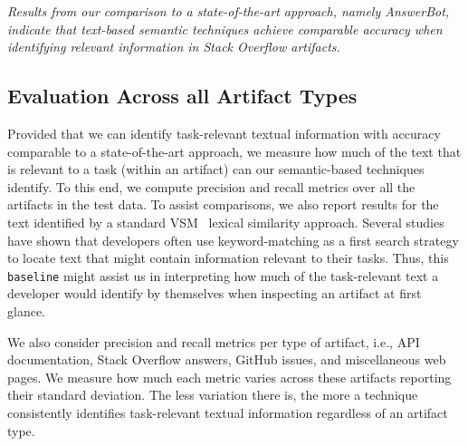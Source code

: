 





\medskip
\begin{bluequote}
    \textit{Results from our comparison to a state-of-the-art approach, namely AnswerBot, 
    indicate that text-based semantic techniques achieve comparable accuracy  
    when identifying relevant information in Stack Overflow artifacts.}
\end{bluequote}






\subsection{Evaluation Across all Artifact Types}
\label{cp5:results-all}





Provided that we can identify task-relevant textual information with accuracy comparable to a state-of-the-art approach, 
we measure how much of the text that is relevant to a task (within an artifact)
can our semantic-based techniques identify.
To this end, we compute precision and recall metrics over all the artifacts in the test data. 
To assist comparisons, we also report results for the text identified by a
standard \acf{VSM}~\cite{Salton1975vsm} lexical similarity approach. Several studies~\cite{Ko2006a, Freund2015, marques2020}
have shown that developers often use keyword-matching as a first search strategy to locate text that might contain information relevant to their tasks.
Thus, this \texttt{baseline} might assist us in interpreting 
how much of the task-relevant text a developer would identify by themselves
when inspecting an artifact at first glance.


We also consider precision and recall metrics per type of artifact, i.e., API documentation, Stack Overflow answers, GitHub issues, and miscellaneous web pages.
We measure how much each metric varies across these artifacts reporting their standard deviation.
The less variation there is, the more a technique consistently identifies task-relevant textual information regardless of an artifact type.


